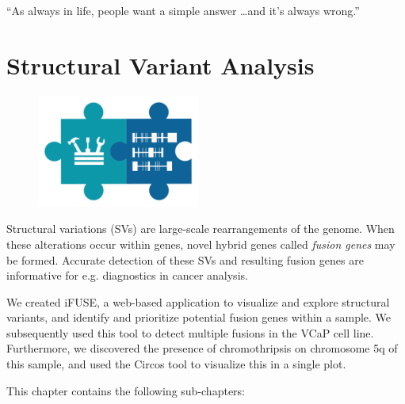 \cleartorightpage
\begin{savequote}[75mm]
“As always in life, people want a simple answer \ldots and it’s always wrong.”
\end{savequote}

\chapter{Structural Variant Analysis}\label{chapter:fusiongenes}
\setcounter{figure}{-1}
\setcounter{table}{-1}
\setcounter{section}{-1}

\begin{figure}[t!]
\includegraphics[height=10em]{frontmatter/images/chapter-header-fusion-tools.png}
\end{figure}
\setcounter{figure}{-1}
\setcounter{table}{-1}
\setcounter{section}{-1}


Structural variations (SVs) are large-scale rearrangements of the genome. When these alterations occur within genes, novel hybrid genes called \emph{fusion genes} may be formed. Accurate detection of these SVs and resulting fusion genes are informative for e.g. diagnostics in cancer analysis.

We created iFUSE, a web-based application to visualize and explore structural variants, and identify and prioritize potential fusion genes within a sample. We subsequently used this tool to detect multiple fusions in the VCaP cell line. Furthermore, we discovered the presence of chromothripsis on chromosome 5q of this sample, and used the Circos tool to visualize this in a single plot.

This chapter contains the following sub-chapters:

